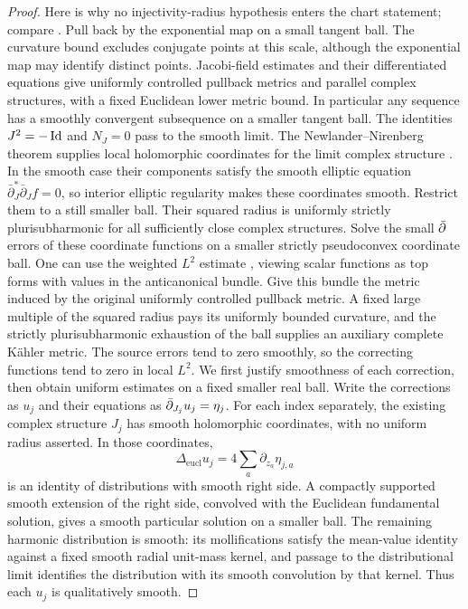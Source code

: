 \begin{proof}
Here is why no injectivity-radius hypothesis enters the chart
statement; compare \cite[Lemma~2.2]{ChauTamSimply}.
Pull back by the exponential map on a small tangent ball.  The
curvature bound excludes conjugate points at this scale, although
the exponential map may identify distinct points.  Jacobi-field
estimates and their differentiated equations give uniformly
controlled pullback metrics and parallel complex structures, with
a fixed Euclidean lower metric bound.  In particular any sequence
has a smoothly convergent subsequence on a smaller tangent ball.
The identities $J^2=-\operatorname{Id}$ and $N_J=0$ pass to the smooth limit.
The Newlander--Nirenberg theorem supplies local holomorphic coordinates
for the limit complex structure \cite{NewlanderNirenberg}
\cite[Theorem~1.1]{HillTaylor}.  In the smooth case their components
satisfy the smooth elliptic equation $\bar\partial_J^*\bar\partial_J f=0$,
so interior elliptic regularity makes these coordinates smooth.
Restrict them to a still smaller ball.  Their squared radius is uniformly strictly
plurisubharmonic for all sufficiently close complex structures.
Solve the small $\bar\partial$ errors of these coordinate functions on
a smaller strictly pseudoconvex coordinate ball.  One can use the
weighted $L^2$ estimate \cite{Hormander,Demailly}, viewing scalar
functions as top forms with values in the anticanonical bundle.
Give this bundle the metric induced by the original uniformly
controlled pullback metric.  A fixed large multiple of the squared
radius pays its uniformly
bounded curvature, and the strictly plurisubharmonic exhaustion
of the ball supplies an auxiliary complete K\"ahler metric.
The source errors tend to zero smoothly, so the correcting
functions tend to zero in local $L^2$.  We first justify smoothness of
each correction, then obtain uniform estimates on a fixed smaller
real ball.  Write the corrections as $u_j$
and their equations as $\bar\partial_{J_j}u_j=\eta_j$.
For each index separately, the existing complex structure $J_j$
has smooth holomorphic coordinates, with no uniform radius asserted.
In those coordinates,
\[
 \Delta_{\mathrm{eucl}}u_j
   =4\sum_a\partial_{z_a}\eta_{j,a}
\]
is an identity of distributions with smooth right side.  A compactly
supported smooth extension of the right side, convolved with the
Euclidean fundamental solution, gives a smooth particular solution
on a smaller ball.
The remaining harmonic distribution is smooth: its mollifications
satisfy the mean-value identity against a fixed smooth radial
unit-mass kernel, and passage to the distributional limit identifies
the distribution with its smooth convolution by that kernel.
Thus each $u_j$ is qualitatively smooth.


\end{proof}
